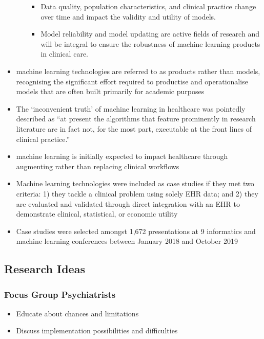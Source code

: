 \documentclass[
  man]{apa7}
\providecommand{\tightlist}{%
  \setlength{\itemsep}{0pt}\setlength{\parskip}{0pt}}
\begin{document}
\begin{itemize}
\begin{itemize}
    \begin{itemize}
    \tightlist
    \item
      Data quality, population characteristics, and clinical practice change over time and impact the validity and utility of models.
    \item
      Model reliability and model updating are active fields of research and will be integral to ensure the robustness of machine learning products in clinical care.
    \end{itemize}
  \end{itemize}
\item
  machine learning technologies are referred to as products rather than models, recognising the significant effort required to productise and operationalise models that are often built primarily for academic purposes
\item
  The `inconvenient truth' of machine learning in healthcare was pointedly described as ``at present the algorithms that feature prominently in research literature are in fact not, for the most part, executable at the front lines of clinical practice.''
\item
  machine learning is initially expected to impact healthcare through augmenting rather than replacing clinical workflows
\item
  Machine learning technologies were included as case studies if they met two criteria: 1) they tackle a clinical problem using solely EHR data; and 2) they are evaluated and validated through direct integration with an EHR to demonstrate clinical, statistical, or economic utility
\item
  Case studies were selected amongst 1,672 presentations at 9 informatics and machine learning conferences between January 2018 and October 2019
\end{itemize}

\hypertarget{research-ideas}{%
\subsection{Research Ideas}\label{research-ideas}}

\hypertarget{focus-group-psychiatrists}{%
\subsubsection{Focus Group Psychiatrists}\label{focus-group-psychiatrists}}

\begin{itemize}
\tightlist
\item
  Educate about chances and limitations
\item
  Discuss implementation possibilities and difficulties
\end{itemize}
\end{document}

